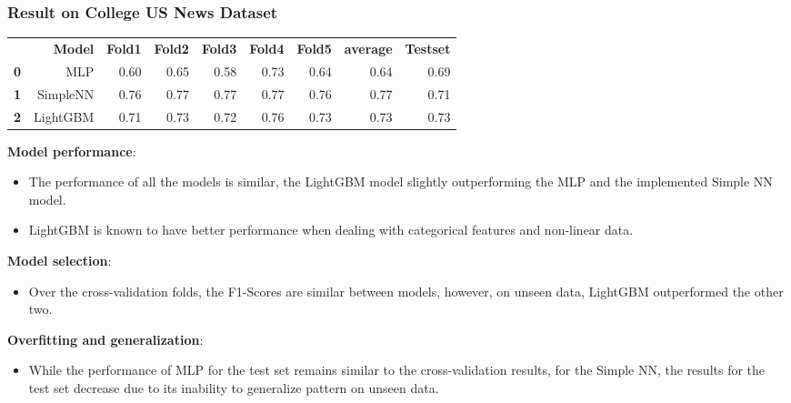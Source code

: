 \documentclass[10pt]{beamer}
\begin{document}
\begin{frame}
\frametitle{Result on College US News Dataset}
\begin{table}
\centering
\scriptsize
\begin{tabularx}{\textwidth}{rrrrrrrrr}
 & \textbf{Model} & \textbf{Fold1} & \textbf{Fold2} & \textbf{Fold3} & \textbf{Fold4} & \textbf{Fold5} & \textbf{average} & \textbf{Testset} \\
\textbf{0} & MLP & 0.60 & 0.65 & 0.58 & 0.73 & 0.64 & 0.64 & 0.69 \\
\textbf{1} & SimpleNN & 0.76 & 0.77 & 0.77 & 0.77 & 0.76 & 0.77 & 0.71 \\
\textbf{2} & LightGBM & 0.71 & 0.73 & 0.72 & 0.76 & 0.73 & 0.73 & 0.73
\end{tabularx}
\end{table}

\scriptsize
\textbf{Model performance}: 
\begin{itemize}
\item The performance of all the models is similar, the LightGBM model slightly outperforming the MLP and the implemented Simple NN model.
\item LightGBM is known to have better performance when dealing with categorical features and non-linear data.
\end{itemize}

\textbf{Model selection}:
\begin{itemize} 
\item Over the cross-validation folds, the F1-Scores are similar between models, however, on unseen data, LightGBM outperformed the other two.
\end{itemize}

\textbf{Overfitting and generalization}:
\begin{itemize}
\item While the performance of MLP for the test set remains similar to the cross-validation results, for the Simple NN, the results for the test set decrease due to its inability to generalize pattern on unseen data.
\end{itemize}
\end{frame}
\end{document}

